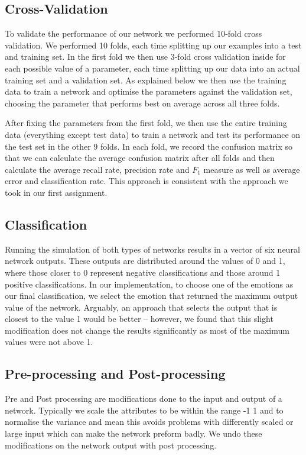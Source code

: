 \documentclass[10pt,a4paper]{article}
\begin{document}
\subsection{Cross-Validation}


To validate the performance of our network we performed 10-fold cross validation. We performed 10 folds, each time splitting up our examples into a test and training set. In the first fold we then use 3-fold cross validation inside for each possible value of a parameter, each time splitting up our data into an actual training set and a validation set. As explained below we then use the training data to train a network and optimise the parameters against the validation set, choosing the parameter that performs best on average across all three folds. 

After fixing the parameters from the first fold, we then use the entire training data (everything except test data) to train a network and test its performance on the test set in the other 9 folds. In each fold, we record the confusion matrix so that we can calculate the average confusion matrix after all folds and then calculate the average recall rate, precision rate and $F_1$ measure as well as average error and classification rate. This approach is consistent with the approach we took in our first assignment.

\subsection{Classification}
Running the simulation of both types of networks results in a vector of six neural network outputs. These outputs are distributed around the values of 0 and 1, where those closer to 0 represent negative classifications and those around 1 positive classifications. In our implementation, to choose one of the emotions as our final classification, we select the emotion that returned the maximum output value of the network. Arguably, an approach that selects the output that is closest to the value 1 would be better -- however, we found that this slight modification does not change the results significantly as most of the maximum values were not above 1.

\subsection{Pre-processing and Post-processing}
Pre and Post processing are modifications done to the input and output of a network.
Typically we scale the attributes to be within the range -1 1 and to normalise the variance and mean this avoids problems with differently scaled or large input which can make the network preform badly.
We undo these modifications on the network output with post processing.
\end{document}
